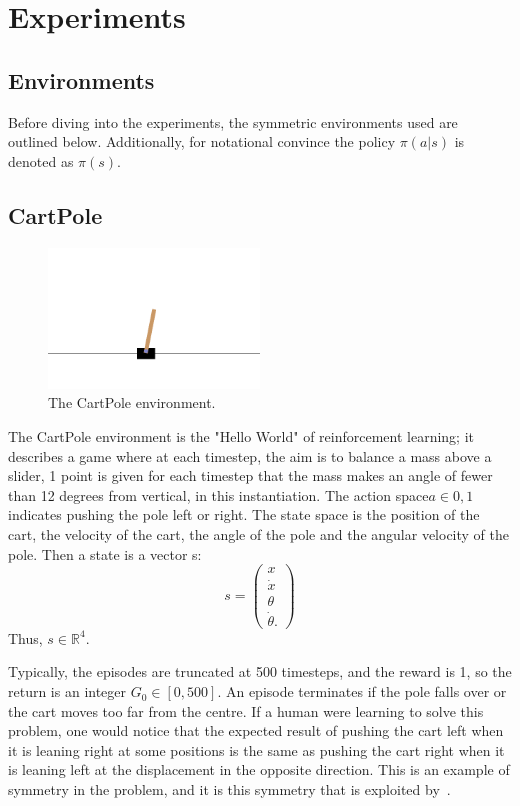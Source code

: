 \chapter{Experiments}
\section{Environments}
Before diving into the experiments, the symmetric environments used are outlined below. Additionally, for notational convince the policy $\pi(a|s)$ is denoted as $\pi(s)$.
\section{CartPole}\label{sec:cartpole}
\begin{figure}[h!]
	\centering
	\includegraphics[width=0.5\textwidth]{Figures/cart_pole.png}
	\caption{The CartPole environment.}
\end{figure}
The CartPole environment is the "Hello World" of reinforcement learning; it describes a game where at each timestep, the aim is to balance a mass above a slider, 1 point is given for each timestep that the mass makes an angle of fewer than 12 degrees from vertical, in this instantiation. The action space$a \in {0,1}$ indicates pushing the pole left or right. The state space is the position of the cart, the velocity of the cart, the angle of the pole and the angular velocity of the pole. Then a state is a vector s:
\begin{equation}
	s = \begin{pmatrix}
		x       \\
		\dot{x} \\
		\theta  \\
		\dot{\theta}.
	\end{pmatrix}
\end{equation}
Thus, $s \in \mathbb{R}^4$.

Typically, the episodes are truncated at 500 timesteps, and the reward is 1, so the return is an integer $G_0 \in [0, 500]$. An episode terminates if the pole falls over or the cart moves too far from the centre. If a human were learning to solve this problem, one would notice that the expected result of pushing the cart left when it is leaning right at some positions is the same as pushing the cart right when it is leaning left at the displacement in the opposite direction. This is an example of symmetry in the problem, and it is this symmetry that is exploited by~\cite{vanderpol2020mdp, mondal2020group}.

